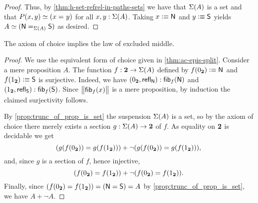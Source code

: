 \begin{proof}
Thus, by \autoref{thm:h-set-refrel-in-paths-sets} we have that $\susp(A)$ is a set and that $P(x,y) \eqvsym (\id{x}{y})$ for all $x,y:\susp(A)$.
Taking $x\defeq \north$ and $y\defeq \south$ yields $\eqv{A}{(\id[\susp(A)]\north\south)}$ as desired.
\end{proof}

\begin{thm}[Diaconescu]\label{thm:1surj_to_surj_to_pem}
  The axiom of choice implies the law of excluded middle.
\end{thm}

\begin{proof}
We use the equivalent form of choice given in \autoref{thm:ac-epis-split}.
Consider a mere proposition $A$.
The function $f:\bool\to\susp(A)$ defined by
$f(\bfalse) \defeq \north$ and $f(\btrue) \defeq \south$
is surjective.
Indeed, we have
$\pairr{\bfalse,\refl{\north}} : \hfiber{f}{\north}$
and $\pairr{\btrue,\refl{\south}} :\hfiber{f}{\south}$.
Since $\bbrck{\hfiber{f}{x}}$ is a mere proposition, by induction the claimed surjectivity follows.

By \autoref{prop:trunc_of_prop_is_set} the suspension $\susp(A)$
is a set, so by the axiom of choice there merely exists a
section $g: \susp(A) \to \bool$ of $f$.
As equality on $\bool$ is decidable we get
\begin{equation*}
 (g(f(\bfalse))= g(f(\btrue))) +
 \lnot (g(f(\bfalse))= g(f(\btrue))),
\end{equation*}
and, since $g$ is a section of $f$, hence injective,
\begin{equation*}
(f(\bfalse) = f(\btrue)) +
\lnot (f(\bfalse) = f(\btrue)).
\end{equation*}
Finally, since $(f(\bfalse)=f(\btrue)) = (\north=\south) = A$ by \autoref{prop:trunc_of_prop_is_set}, we have $A+\neg A$.
\end{proof}




